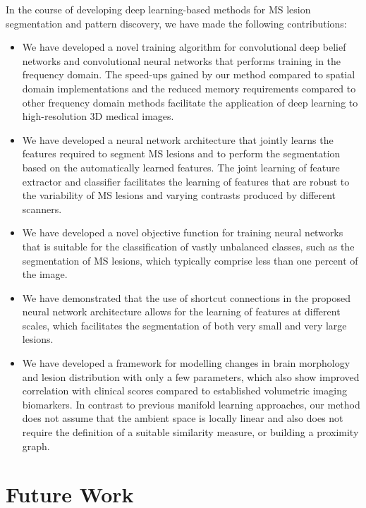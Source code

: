 In the course of developing deep learning-based methods for MS lesion
segmentation and pattern discovery, we have made the following contributions:
\begin{itemize}
\item We have developed a novel training algorithm for convolutional deep belief
networks and convolutional neural networks that performs training in the
frequency domain. The speed-ups gained by our method compared to spatial domain
implementations and the reduced memory requirements compared to other frequency
domain methods facilitate the application of deep learning to high-resolution
3D medical images.
  
\item We have developed a neural network architecture that jointly learns the
features required to segment MS lesions and to perform the segmentation based on
the automatically learned features. The joint learning of feature extractor and
classifier facilitates the learning of features that are robust to the
variability of MS lesions and varying contrasts produced by different scanners.

\item We have developed a novel objective function for training neural networks
that is suitable for the classification of vastly unbalanced classes, such as
the segmentation of MS lesions, which typically comprise less than one percent
of the image.

\item We have demonstrated that the use of shortcut connections in the proposed
neural network architecture allows for the learning of features at different
scales, which facilitates the segmentation of both very small and very large
lesions.

\item We have developed a framework for modelling changes in brain morphology
and lesion distribution with only a few parameters, which also show improved
correlation with clinical scores compared to established volumetric imaging
biomarkers. In contrast to previous manifold learning approaches, our method
does not assume that the ambient space is locally linear and also does not
require the definition of a suitable similarity measure, or building a proximity
graph.
\end{itemize}

\section[Future work]{Future Work}

